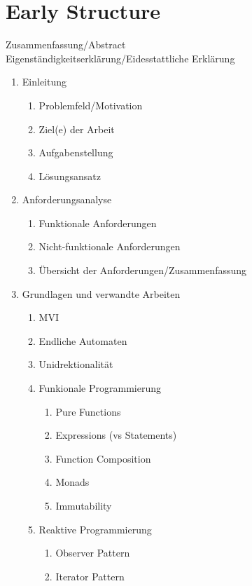 \section{Early Structure}
\label{sec:early-structure}

\quad Zusammenfassung/Abstract \\
\quad Eigenständigkeitserklärung/Eidesstattliche Erklärung
\begin{enumerate}
    \item Einleitung
    \begin{enumerate}
        \item Problemfeld/Motivation
        \item Ziel(e) der Arbeit
        \item Aufgabenstellung
        \item Lösungsansatz
    \end{enumerate}
    \item Anforderungsanalyse
    \begin{enumerate}
        \item Funktionale Anforderungen
        \item Nicht-funktionale Anforderungen
        \item Übersicht der Anforderungen/Zusammenfassung
    \end{enumerate}
    \item Grundlagen und verwandte Arbeiten
    \begin{enumerate}
        \item MVI
        \item Endliche Automaten
        \item Unidrektionalität
        \item Funkionale Programmierung
        \begin{enumerate}
            \item Pure Functions
            \item Expressions (vs Statements)
            \item Function Composition
            \item Monads
            \item Immutability
        \end{enumerate}
        \item Reaktive Programmierung
        \begin{enumerate}
            \item Observer Pattern
            \item Iterator Pattern

\end{enumerate}
\end{enumerate}
\end{enumerate}
